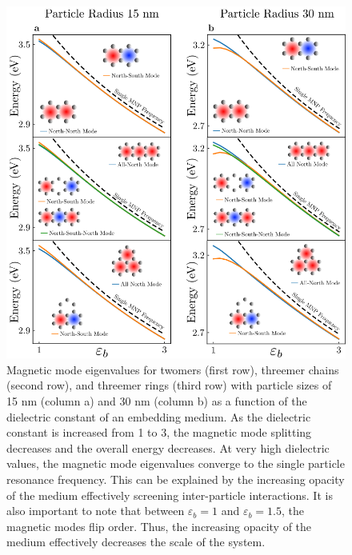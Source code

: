 \documentclass[journal=ancac3,manuscript=article]{achemso}
\begin{document}
\begin{figure}
\centering
\includegraphics[width=.65\paperwidth]{dielectric_study.png}
\caption{Magnetic mode eigenvalues for twomers (first row), threemer chains (second row), and threemer rings (third row) with particle sizes of 15 nm (column a) and 30 nm (column b) as a function of the dielectric constant of an embedding medium. As the dielectric constant is increased from 1 to 3, the magnetic mode splitting decreases and the overall energy decreases. At very high dielectric values, the magnetic mode eigenvalues converge to the single particle resonance frequency. This can be explained by the increasing opacity of the medium effectively screening inter-particle interactions. It is also important to note that between $\varepsilon_b = 1$ and $\varepsilon_b = 1.5$, the magnetic modes flip order. Thus, the increasing opacity of the medium effectively decreases the scale of the system.}
\label{fig:dielectric}
\end{figure}
\end{document}
